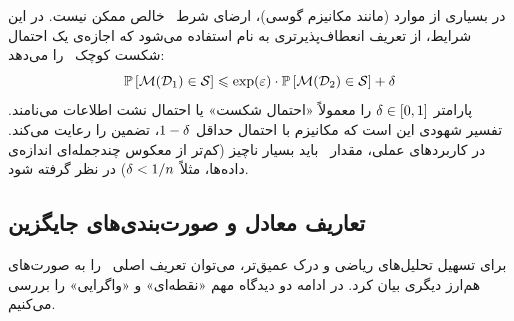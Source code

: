 \begin{تعریف}
\label{def:approx-cdp}
در بسیاری از موارد (مانند مکانیزم گوسی)، ارضای شرط \DP \ خالص ممکن نیست. در این شرایط، از تعریف انعطاف‌پذیرتری به نام \DP[(\eps, \del)] استفاده می‌شود که اجازه‌ی یک احتمال شکست کوچک \del \ را می‌دهد:
\begin{equation}
\label{eq:cdp-delta}
\mathbb{P}\left[ \mech(\Dset[1]) \in \Sset \right] \le \exp(\eps) \cdot \mathbb{P}\left[ \mech(\Dset[2]) \in \Sset \right] + \del
\end{equation}
پارامتر $\delta \in [0, 1]$ را معمولاً «احتمال شکست» یا احتمال نشت اطلاعات می‌نامند. تفسیر شهودی این است که مکانیزم با احتمال حداقل $1-\delta$، تضمین \DP را رعایت می‌کند. در کاربردهای عملی، مقدار \del \ باید بسیار ناچیز (کم‌تر از معکوس چندجمله‌ای اندازه‌ی داده‌ها، مثلاً $\delta < 1/n$) در نظر گرفته شود.
\end{تعریف}

\subsection{تعاریف معادل و صورت‌بندی‌های جایگزین}
\label{sec:cdp-equivalent-defs}

برای تسهیل تحلیل‌های ریاضی و درک عمیق‌تر، می‌توان تعریف اصلی \DP\ را به صورت‌های هم‌ارز دیگری بیان کرد. در ادامه دو دیدگاه مهم «نقطه‌ای» و «واگرایی» را بررسی می‌کنیم.

